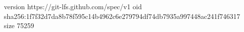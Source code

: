 version https://git-lfs.github.com/spec/v1
oid sha256:1f7f32d7da8b78f595c14b4962c6e279794df74db7935a997448ac241f746317
size 75259
